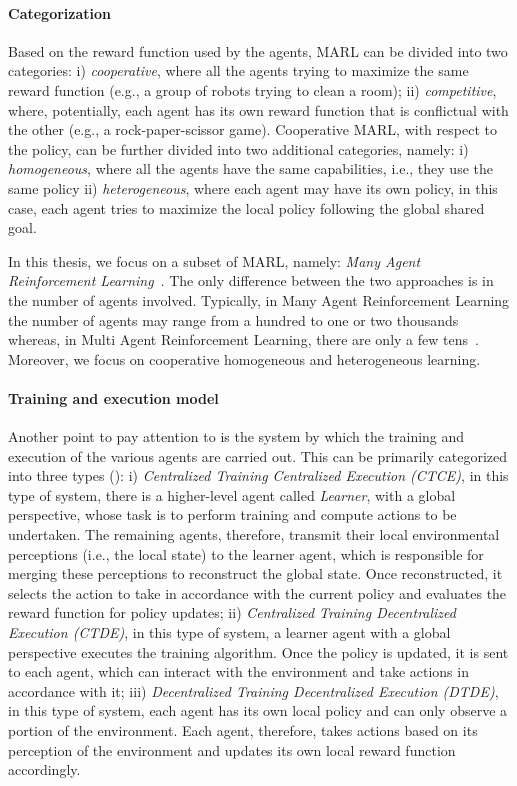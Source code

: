 \documentclass[12pt,a4paper,openright,twoside]{book}
\begin{document}
\paragraph{Categorization}

Based on the reward function used by the agents, MARL can be divided into two categories: 
    i) \emph{cooperative}, where all the agents trying to maximize the same reward function (e.g., a group of robots
    trying to clean a room); 
    ii) \emph{competitive}, where, potentially, each agent has its own reward function that is conflictual with the other (e.g., a rock-paper-scissor game). 
    Cooperative MARL, with respect to the policy, can be further divided into two additional categories, namely: 
    i) \emph{homogeneous}, where all the agents have the same capabilities, i.e., they use the same policy 
    ii) \emph{heterogeneous}, where each agent may have its own policy, in this case, each agent tries to maximize the local policy following the global shared goal.

In this thesis, we focus on a subset of MARL, namely: \emph{Many Agent Reinforcement Learning}~\cite{yang2021many}. The only
    difference between the two approaches is in the number of agents involved. 
    Typically, in Many Agent Reinforcement Learning the number of agents may range from a hundred to one or two
    thousands whereas, in Multi Agent Reinforcement Learning, there are only a few tens~\cite{smac,marl-curricula}.
    Moreover, we focus on cooperative homogeneous and heterogeneous learning.


\paragraph{Training and execution model}
   
Another point to pay attention to is the system by which the training and execution of the various agents are carried out. This can be primarily categorized into three types ():
    i) \emph{Centralized Training Centralized Execution (CTCE)}, in this type of system, there is a higher-level agent called \emph{Learner}, with a global perspective, whose task is to perform training and compute actions to be undertaken. The remaining agents, therefore, transmit their local environmental perceptions (i.e., the local state) to the learner agent, which is responsible for merging these perceptions to reconstruct the global state. Once reconstructed, it selects the action to take in accordance with the current policy and evaluates the reward function for policy updates;
    ii) \emph{Centralized Training Decentralized Execution (CTDE)}, in this type of system, a learner agent with a global perspective executes the training algorithm. Once the policy is updated, it is sent to each agent, which can interact with the environment and take actions in accordance with it;
    iii) \emph{Decentralized Training Decentralized Execution (DTDE)}, in this type of system, each agent has its own local policy and can only observe a portion of the environment. Each agent, therefore, takes actions based on its perception of the environment and updates its own local reward function accordingly.
\end{document}
